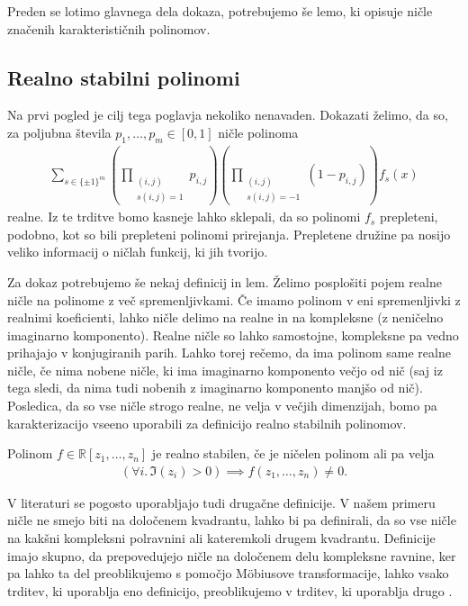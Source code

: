 Preden se lotimo glavnega dela dokaza, potrebujemo še lemo, ki opisuje ničle značenih karakterističnih polinomov.

\subsection{Realno stabilni polinomi}
Na prvi pogled je cilj tega poglavja nekoliko nenavaden. Dokazati želimo, da so, za poljubna števila \(p_1, \ldots, p_m \in [0,1]\) ničle polinoma
\begin{align*}
    \sum_{s\in \{\pm 1\}^m} \left(\prod_{\substack{(i,j) \\s(i,j)=1}} p_{i,j}\right) \left(\prod_{\substack{(i,j)\\s(i,j)=-1}} (1- p_{i,j})\right) f_s(x)
\end{align*}
realne. Iz te trditve bomo kasneje lahko sklepali, da so polinomi \(f_s\) prepleteni, podobno, kot so bili prepleteni polinomi prirejanja. Prepletene družine pa nosijo veliko informacij o ničlah funkcij, ki jih tvorijo.

Za dokaz potrebujemo še nekaj definicij in lem. Želimo posplošiti pojem realne ničle na polinome z več spremenljivkami. Če imamo polinom v eni spremenljivki z realnimi koeficienti, lahko ničle delimo na realne in na kompleksne (z neničelno imaginarno komponento). Realne ničle so lahko samostojne, kompleksne pa vedno prihajajo v konjugiranih parih. Lahko torej rečemo, da ima polinom same realne ničle, če nima nobene ničle, ki ima imaginarno komponento večjo od nič (saj iz tega sledi, da nima tudi nobenih z imaginarno komponento manjšo od nič). Posledica, da so vse ničle strogo realne, ne velja v večjih dimenzijah, bomo pa karakterizacijo vseeno uporabili za definicijo realno stabilnih polinomov.
\begin{definicija}
    Polinom \(f\in \mathbb R[z_1, \ldots, z_n]\) je realno stabilen, če je ničelen polinom ali pa velja
    \begin{align*}
        \left(\forall i.\, \Im(z_i) > 0\right) \implies f(z_1, \ldots, z_n) \neq 0.
    \end{align*}
\end{definicija}
V literaturi se pogosto uporabljajo tudi drugačne definicije. V našem primeru ničle ne smejo biti na določenem kvadrantu, lahko bi pa definirali, da so vse ničle na kakšni kompleksni polravnini ali kateremkoli drugem kvadrantu. Definicije imajo skupno, da prepovedujejo ničle na določenem delu kompleksne ravnine, ker pa lahko ta del preoblikujemo s pomočjo Möbiusove transformacije, lahko vsako trditev, ki uporablja eno definicijo, preoblikujemo v trditev, ki uporablja drugo \cite{mckenzie}.

